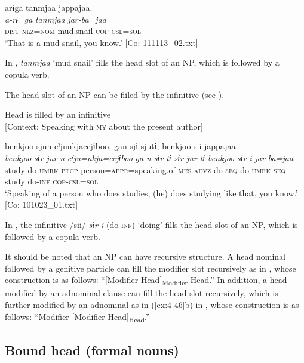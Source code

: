 {\TM}
\glll arɨga  tanmjaa  jappajaa.\\
\textit{a-rɨ=ga}  \textit{tanmjaa}  \textit{jar-ba=jaa}\\
    \textsc{dist}-\textsc{nlz}=\textsc{nom}  mud.snail  \textsc{cop}-\textsc{csl}=\textsc{sol}\\
\glt    ‘That is a mud snail, you know.’ [Co: 111113\_02.txt]
\z

In , \textit{tanmjaa} ‘mud snail’ fills the head slot of an NP, which is followed by a copula verb.

The head slot of an NP can be fiiled by the infinitive (see ).

\ea\label{ex:6-9}
 Head is filled by an infinitive\\{}
[Context: Speaking with \textsc{my} about the present author]

{\TM}
\glll {\textbar}benkjoo{\textbar}  sjun  cˀjunkjaccjɨboo,  gan  sjɨ    sjutɨ,  {\textbar}benkjoo{\textbar}  sii  jappajaa.\\
\textit{benkjoo}  \textit{sɨr-jur-n}  \textit{cˀju=nkja=ccjɨboo}  \textit{ga-n}  \textit{sɨr-tɨ}    \textit{sɨr-jur-tɨ}  \textit{benkjoo}  \textit{sɨr-i}  \textit{jar-ba=jaa}\\
study  do-\textsc{umrk}-\textsc{ptcp}  person=\textsc{appr}=speaking.of  \textsc{mes}-\textsc{advz}  do-\textsc{seq}    do-\textsc{umrk}-\textsc{seq}  study  do-\textsc{inf}  \textsc{cop}-\textsc{csl}=\textsc{sol}\\
\glt    ‘Speaking of a person who does studies, (he) does studying like that, you know.’ [Co: 101023\_01.txt]
\z

In , the infinitive /sii/ \textit{sɨr-i} (do-\textsc{inf}) ‘doing’ fills the head slot of an NP, which is followed by a copula verb.

It should be noted that an NP can have recursive structure. A head nominal followed by a genitive particle can fill the modifier slot recursively as in , whose construction is as follows: “[Modifier Head]\textsubscript{Modifier} Head.” In addition, a head modified by an adnominal clause can fill the head slot recursively, which is further modified by an adnominal as in (\ref{ex:4-46}b) in , whose construction is as follows: “Modifier [Modifier Head]\textsubscript{Head}.”

\subsection{Bound head (formal nouns)}


